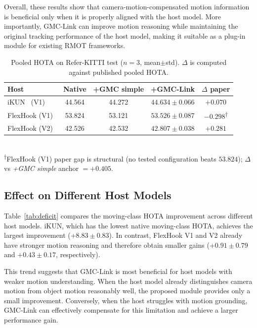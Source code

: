 \documentclass[sigconf,anonymous,nonacm]{acmart}
\begin{document}
Overall, these results show that camera-motion-compensated motion information is beneficial only when it is properly aligned with the host model. More importantly, GMC-Link can improve motion reasoning while maintaining the original tracking performance of the host model, making it suitable as a plug-in module for existing RMOT frameworks.

\begin{table}[t]
\centering
\caption{Pooled HOTA on Refer-KITTI test ($n{=}3$, mean$\pm$std). $\Delta$ is computed against published pooled HOTA.}
\label{tab:main}
\small
\setlength{\tabcolsep}{4pt}
\begin{tabular}{lcccc}
\toprule
Host & Native & +GMC simple & +GMC-Link & $\Delta$ paper \\
\midrule
iKUN~\cite{ikun} (V1)        & 44.564 & 44.272 & $44.634 \pm 0.066$ & $+0.070$ \\
FlexHook (V1)~\cite{flexhook}  & 53.824 & 53.121 & $53.526 \pm 0.087$ & $-0.298$\textsuperscript{$\dagger$} \\
FlexHook (V2)~\cite{flexhook}  & 42.526 & 42.532 & $42.807 \pm 0.038$ & $+0.281$ \\
\bottomrule
\end{tabular}
\\[2pt]
{\footnotesize \textsuperscript{$\dagger$}FlexHook (V1) paper gap is structural (no tested configuration beats $53.824$); $\Delta$ vs \emph{+GMC simple} anchor $= +0.405$.}
\end{table}

\subsection{Effect on Different Host Models}
\label{sec:deficit}

Table~\ref{tab:deficit} compares the moving-class HOTA improvement across different host models. iKUN, which has the lowest native moving-class HOTA, achieves the largest improvement ($+8.83 \pm 0.83$). In contrast, FlexHook V1 and V2 already have stronger motion reasoning and therefore obtain smaller gains ($+0.91 \pm 0.79$ and $+0.43 \pm 0.17$, respectively).

This trend suggests that GMC-Link is most beneficial for host models with weaker motion understanding. When the host model already distinguishes camera motion from object motion reasonably well, the proposed module provides only a small improvement. Conversely, when the host struggles with motion grounding, GMC-Link can effectively compensate for this limitation and achieve a larger performance gain.
\end{document}
